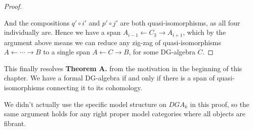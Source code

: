 \begin{proof}
\begin{center}
\end{center}

And the compositions $q'\circ i'$ and $p'\circ j'$ are both quasi-isomorphisms, as all four individually are. Hence we have a span $A_{i-1}\longleftarrow C_3 \longrightarrow A_{i+1}$, which by the argument above means we can reduce any zig-zag of quasi-isomorphisms $A\leftarrow \cdots \rightarrow B$ to a single span $A\leftarrow C\rightarrow B$, for some DG-algebra $C$. 
\end{proof}

This finally resolves \textbf{Theorem A.} from the motivation in the beginning of this chapter. We have a formal DG-algebra if and only if there is a span of quasi-isomorphisms connecting it to its cohomology.  


We didn't actually use the specific model structure on $DGA_k$ in this proof, so the same argument holds for any right proper model categories where all objects are fibrant. 

